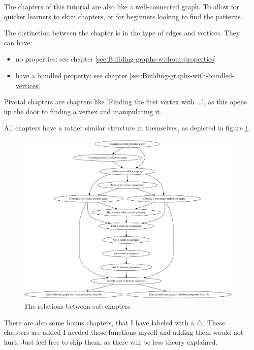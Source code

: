 The chapters of this tutorial are also like a well-connected graph.
To allow for quicker learners to skim chapters, or for beginners looking
to find the patterns.

The distinction between the chapter is in the type of edges and vertices.
They can have:

\begin{itemize}
  \item no properties: 
    see chapter \ref{sec:Building-graphs-without-properties}
  \item have a bundled property: 
    see chapter \ref{sec:Building-graphs-with-bundled-vertices}
\end{itemize}

Pivotal chapters are chapters like 'Finding the first vertex with ...', as
this opens up the door to finding a vertex and manipulating it.

All chapters have a rather similar structure in themselves, as depicted
in figure \ref{fig:The-relations-between-subchapters}.

\begin{figure}[!htbp]
  \includegraphics[width=\textwidth]{create_tutorial_subchapters_graph.png}
  \caption{
    The relations between sub-chapters
  }
  \label{fig:The-relations-between-subchapters}
\end{figure}

There are also some bonus chapters, that I have labeled with a $\triangle$.
These chapters are added I needed these functions myself and adding them
would not hurt.
Just feel free to skip them, as there will be less theory explained.

